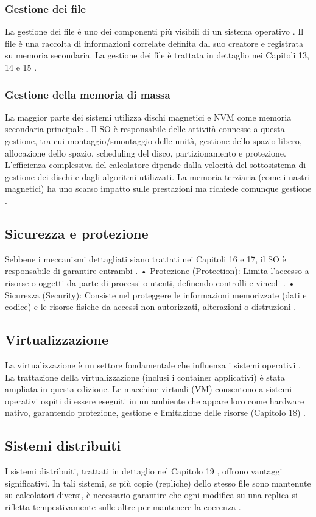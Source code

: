 \documentclass[12pt,a4paper, openany]{book}
\begin{document}
\begin{small}
		\subsubsection{Gestione dei file} La gestione dei file è uno dei componenti più visibili di un sistema operativo
		. Il file è una raccolta di informazioni correlate definita dal suo creatore e registrata su memoria secondaria. La gestione dei file è trattata in dettaglio nei Capitoli 13, 14 e 15
		.
		\subsubsection{Gestione della memoria di massa} La maggior parte dei sistemi utilizza dischi magnetici e NVM come memoria secondaria principale
		. Il SO è responsabile delle attività connesse a questa gestione, tra cui montaggio/smontaggio delle unità, gestione dello spazio libero, allocazione dello spazio, scheduling del disco, partizionamento e protezione. L'efficienza complessiva del calcolatore dipende dalla velocità del sottosistema di gestione dei dischi e dagli algoritmi utilizzati. La memoria terziaria (come i nastri magnetici) ha uno scarso impatto sulle prestazioni ma richiede comunque gestione
		.
		\subsection{Sicurezza e protezione} Sebbene i meccanismi dettagliati siano trattati nei Capitoli 16 e 17, il SO è responsabile di garantire entrambi
		.
		\newline
		• Protezione (Protection): Limita l’accesso a risorse o oggetti da parte di processi o utenti, definendo controlli e vincoli
		.
		\newline
		• Sicurezza (Security): Consiste nel proteggere le informazioni memorizzate (dati e codice) e le risorse fisiche da accessi non autorizzati, alterazioni o distruzioni
		.
		\subsection{Virtualizzazione} La virtualizzazione è un settore fondamentale che influenza i sistemi operativi
		. La trattazione della virtualizzazione (inclusi i container applicativi) è stata ampliata in questa edizione. Le macchine virtuali (VM) consentono a sistemi operativi ospiti di essere eseguiti in un ambiente che appare loro come hardware nativo, garantendo protezione, gestione e limitazione delle risorse (Capitolo 18)
		.
		\subsection{Sistemi distribuiti} I sistemi distribuiti, trattati in dettaglio nel Capitolo 19
		, offrono vantaggi significativi. In tali sistemi, se più copie (repliche) dello stesso file sono mantenute su calcolatori diversi, è necessario garantire che ogni modifica su una replica si rifletta tempestivamente sulle altre per mantenere la coerenza
		.

\end{small}
\end{document}
